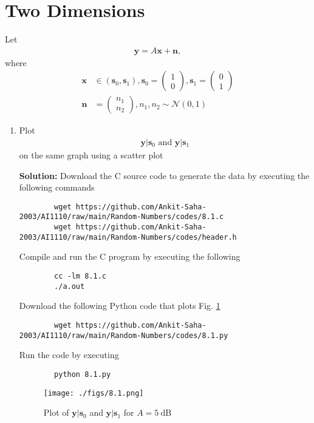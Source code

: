 \documentclass[journal,12pt,twocolumn]{IEEEtran}
\newcommand{\solution}{\noindent \textbf{Solution: }}
\providecommand{\brak}[1]{\ensuremath{\left(#1\right)}}
\providecommand{\gauss}[2]{\mathcal{N}\ensuremath{\left(#1,#2\right)}}
\providecommand{\mbf}{\mathbf}
\let\vec\mathbf
\numberwithin{equation}{section}
\renewcommand\thesection{\arabic{section}}
\newcommand{\myvec}[1]{\ensuremath{\begin{pmatrix}#1\end{pmatrix}}}
\begin{document}
	\section{Two Dimensions}
	Let 
	\begin{align}
		\vec{y} = A\vec{x} + \vec{n},
	\end{align}
	where 
	\begin{align}
		\vec{x} &\in \brak{\vec{s}_0,\vec{s}_1}, 
		\vec{s}_0 = \myvec{1 \\ 0},
		\vec{s}_1 = \myvec{0 \\ 1} \\
		\vec{n} &= \myvec{n_1 \\ n_2},
		n_1,n_2 \sim \gauss{0}{1}
	\end{align}
	
	\begin{enumerate}[label=\thesection.\arabic*,ref=\thesection.\theenumi]
	\item Plot 
	\begin{align}
		\vec{y}|\vec{s}_0 \text{ and } \vec{y}|\vec{s}_1
	\end{align}
	on the same graph using a scatter plot
	
	\solution Download the C source code to generate the data by executing the following commands
	\begin{lstlisting}
		wget https://github.com/Ankit-Saha-2003/AI1110/raw/main/Random-Numbers/codes/8.1.c
		wget https://github.com/Ankit-Saha-2003/AI1110/raw/main/Random-Numbers/codes/header.h
	\end{lstlisting}
	Compile and run the C program by executing the following
	\begin{lstlisting}
		cc -lm 8.1.c
		./a.out
	\end{lstlisting}
	
	Download the following Python code that plots Fig. \ref{fig-8.1} 
	\begin{lstlisting}
		wget https://github.com/Ankit-Saha-2003/AI1110/raw/main/Random-Numbers/codes/8.1.py
	\end{lstlisting}
	Run the code by executing
	\begin{lstlisting}
		python 8.1.py
	\end{lstlisting}
	
	\begin{figure}
		\centering
		\texttt{[image: ./figs/8.1.png]}
		\caption{Plot of $\mbf{y}|\mbf{s}_0$ and $\mbf{y}|\mbf{s}_1$ for $A = 5~\mathrm{dB}$}
		\label{fig-8.1}
	\end{figure}
	

\end{enumerate}
\end{document}
